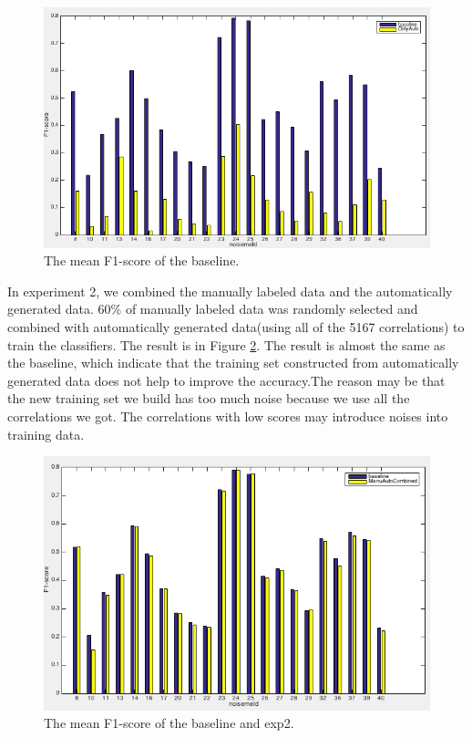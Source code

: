 \documentclass[conference, 11pt, onecolumn]{IEEEtran}
\begin{document}
\begin{figure}[h!]
\centering
\includegraphics[scale=0.45]{figure/fOnlyAuto.png}
\caption{The mean F1-score of the baseline.}
\label{fig:fOnlyAuto}
\end{figure}

In experiment 2, we combined the manually labeled data and the automatically generated data. 60\% of manually labeled data was randomly selected and combined with automatically generated data(using all of the 5167 correlations) to train the classifiers. %
The result is in Figure \ref{fig:fmanuAndAuto}.  The result is almost the same as the baseline, which indicate that the training set constructed from automatically generated data does not help to improve the accuracy.The reason may be that the new training set we build has too much noise because we use all the correlations we got. The correlations with low scores may introduce noises into training data.

\begin{figure}[h!]
\centering
\includegraphics[scale=0.45]{figure/fmanuAndAuto.png}
\caption{The mean F1-score of the baseline and exp2.}
\label{fig:fmanuAndAuto}
\end{figure}
\end{document}
